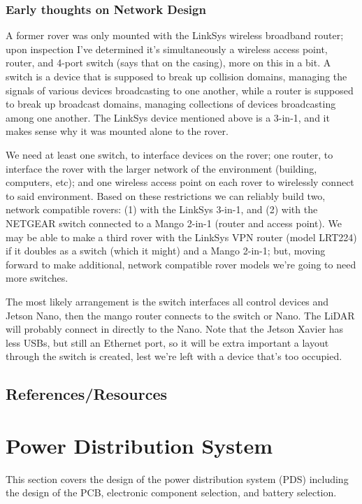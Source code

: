 \documentclass[a4paper, 10pt]{article}
\begin{document}
		\subsubsection{Early thoughts on Network Design}
		A former rover was only mounted with the LinkSys wireless broadband router; upon inspection I've determined it's simultaneously a wireless access point, router, and 4-port switch (says that on the casing), more on this in a bit. A switch is a device that is supposed to break up collision domains, managing the signals of various devices broadcasting to one another, while a router is supposed to break up broadcast domains, managing collections of devices broadcasting among one another. The LinkSys device mentioned above is a 3-in-1, and it makes sense why it was mounted alone to the rover. 
		
		We need at least one switch, to interface devices on the rover; one router, to interface the rover with the larger network of the environment (building, computers, etc); and one wireless access point on each rover to wirelessly connect to said environment. Based on these restrictions we can reliably build two, network compatible rovers: (1) with the LinkSys 3-in-1, and (2) with the NETGEAR switch connected to a Mango 2-in-1 (router and access point). We may be able to make a third rover with the LinkSys VPN router (model LRT224) if it doubles as a switch (which it might) and a Mango 2-in-1; but, moving forward to make additional, network compatible rover models we're going to need more switches. 
		
		The most likely arrangement is the switch interfaces all control devices and Jetson Nano, then the mango router connects to the switch or Nano. The LiDAR will probably connect in directly to the Nano. Note that the Jetson Xavier has less USBs, but still an Ethernet port, so it will be extra important a layout through the switch is created, lest we're left with a device that's too occupied. 
		
	\subsection{References/Resources}


\section{Power Distribution System}
This section covers the design of the power distribution system (PDS) including the design of the PCB, electronic component selection, and battery selection. 
\end{document}
